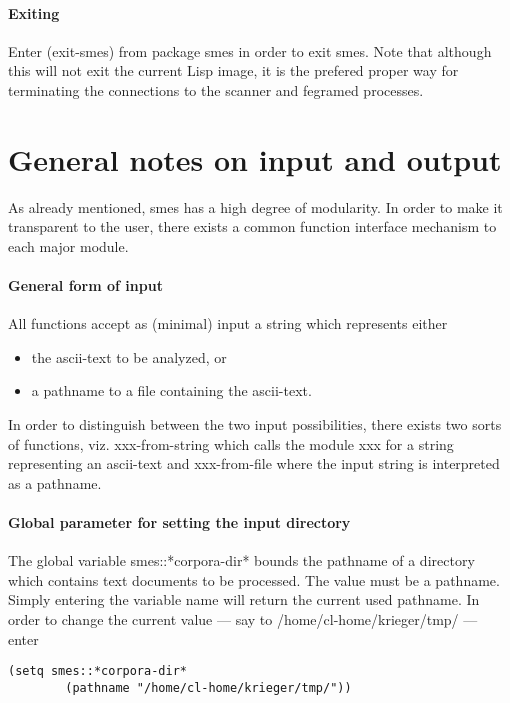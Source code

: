 \paragraph{Exiting}
Enter {\sc (exit-smes)} from package {\sc
smes} in order to exit {\sc smes}. Note that although this
will not exit the current Lisp image, it is the prefered proper way for
terminating the connections to the {\sc scanner} and {\sc fegramed}
processes.

\section{General notes on input and output}

As already mentioned, {\sc smes} has a high degree of modularity. In
order to make it transparent to the user, there exists a common function
interface mechanism to each major module. 

\paragraph{General form of input} All functions accept as
(minimal) input a string which represents either
\begin{itemize}
\item   the ascii-text to be analyzed, or
\item   a pathname to a file containing the ascii-text.
\end{itemize}

In order to distinguish between the two input possibilities, there exists
two sorts of functions, viz. {\sc xxx-from-string} which calls the
module {\sc xxx} for a string representing an ascii-text and {\sc
xxx-from-file} where the input string is interpreted as a pathname.

\paragraph{Global parameter for setting the input directory}

The global variable {\sc smes::*corpora-dir*} bounds the pathname of
a directory which contains text documents to be processed. The value
must be a pathname. Simply entering the variable name will return the
current used pathname. In order to change the current value --- say to 
/home/cl-home/krieger/tmp/ --- enter

\begin{verbatim}
(setq smes::*corpora-dir* 
        (pathname "/home/cl-home/krieger/tmp/"))
\end{verbatim}

